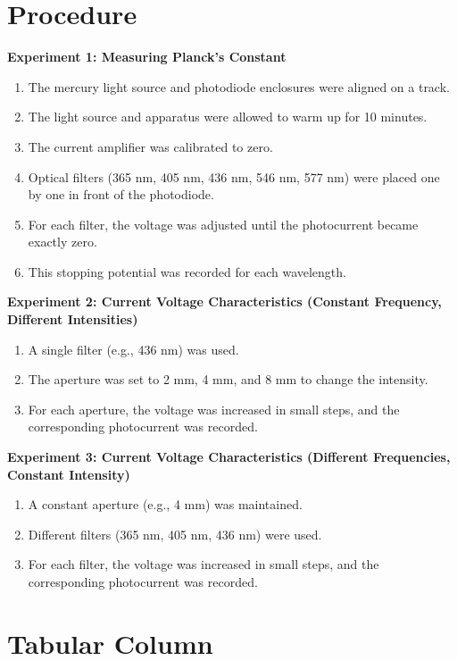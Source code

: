 \documentclass[12pt, a4paper]{article}
\begin{document}
\section{Procedure}
\textbf{Experiment 1: Measuring Planck's Constant}
\begin{enumerate}
    \item The mercury light source and photodiode enclosures were aligned on a track.
    \item The light source and apparatus were allowed to warm up for 10 minutes.
    \item The current amplifier was calibrated to zero.
    \item Optical filters (365 nm, 405 nm, 436 nm, 546 nm, 577 nm) were placed one by one in front of the photodiode.
    \item For each filter, the voltage was adjusted until the photocurrent became exactly zero.
    \item This stopping potential was recorded for each wavelength.
\end{enumerate}

\textbf{Experiment 2: Current Voltage Characteristics (Constant Frequency, Different Intensities)}
\begin{enumerate}
    \item A single filter (e.g., 436 nm) was used.
    \item The aperture was set to 2 mm, 4 mm, and 8 mm to change the intensity.
    \item For each aperture, the voltage was increased in small steps, and the corresponding photocurrent was recorded.
\end{enumerate}

\textbf{Experiment 3: Current Voltage Characteristics (Different Frequencies, Constant Intensity)}
\begin{enumerate}
    \item A constant aperture (e.g., 4 mm) was maintained.
    \item Different filters (365 nm, 405 nm, 436 nm) were used.
    \item For each filter, the voltage was increased in small steps, and the corresponding photocurrent was recorded.
\end{enumerate}

\section{Tabular Column}
\end{document}
